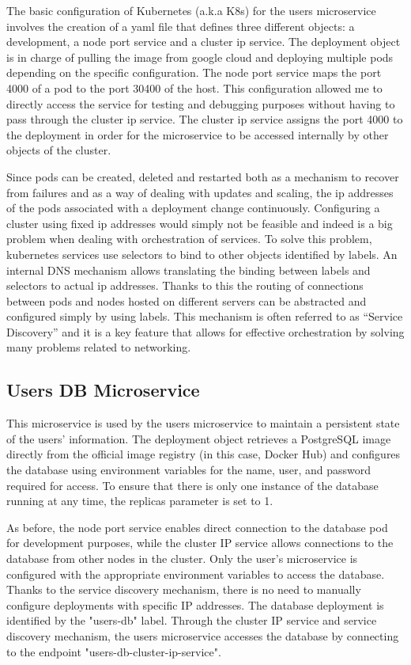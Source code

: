 \documentclass[manuscript,screen,review]{acmart}
\begin{document}
The basic configuration of Kubernetes (a.k.a K8s) for the users microservice involves the creation of a yaml file that defines three different objects: a development, a node port service and a cluster ip service. The deployment object is in charge of pulling the image from google cloud and deploying multiple pods depending on the specific configuration. The node port service maps the port 4000 of a pod to the port 30400 of the host. This configuration allowed me to directly access the service for testing and debugging purposes without having to pass through the cluster ip service. The cluster ip service assigns the port 4000 to the deployment in order for the microservice to be accessed internally by other objects of the cluster.

Since pods can be created, deleted and restarted both as a mechanism to recover from failures and as a way of dealing with updates and scaling, the ip addresses of the pods associated with a deployment change continuously. Configuring a cluster using fixed ip addresses would simply not be feasible and indeed is a big problem when dealing with orchestration of services. To solve this problem, kubernetes services use selectors to bind to other objects identified by labels. An internal DNS mechanism allows translating the binding between labels and selectors to actual ip addresses. Thanks to this the routing of connections between pods and nodes hosted on different servers can be abstracted and configured simply by using labels. This mechanism is often referred to as “Service Discovery” and it is a key feature that allows for effective orchestration by solving many problems related to networking.

\subsection{Users DB Microservice}
This microservice is used by the users microservice to maintain a persistent state of the users' information. The deployment object retrieves a PostgreSQL image directly from the official image registry (in this case, Docker Hub) and configures the database using environment variables for the name, user, and password required for access. To ensure that there is only one instance of the database running at any time, the replicas parameter is set to 1.

As before, the node port service enables direct connection to the database pod for development purposes, while the cluster IP service allows connections to the database from other nodes in the cluster. Only the user's microservice is configured with the appropriate environment variables to access the database. Thanks to the service discovery mechanism, there is no need to manually configure deployments with specific IP addresses.
The database deployment is identified by the "users-db" label. Through the cluster IP service and service discovery mechanism, the users microservice accesses the database by connecting to the endpoint "users-db-cluster-ip-service".
\end{document}
